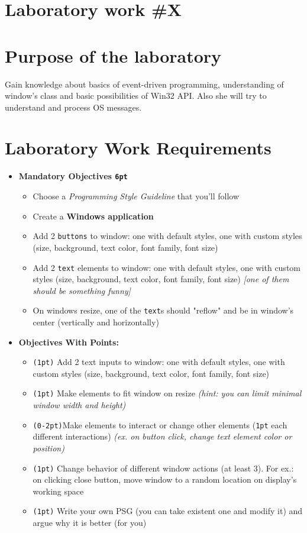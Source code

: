 \section*{Laboratory work \#X}

\section{Purpose of the laboratory}
Gain knowledge about basics of event-driven programming, understanding of window’s class and basic possibilities of Win32 API. Also she will try to understand and process OS messages.
\section{Laboratory Work Requirements}
\begin{itemize}
	\item \textbf{Mandatory Objectives \texttt{6pt}}
	      \begin{itemize}
		      \item Choose a \textit{Programming Style Guideline} that you'll follow
		      \item Create a \textbf{Windows application}
		      \item Add 2 \texttt{buttons} to window: one with default styles, one with custom styles (size, background, text color, font family, font size)
		      \item Add 2 \texttt{text} elements to window: one with default styles, one with custom styles (size, background, text color, font family, font size) \textit{[one of them should be something funny]}
		      \item On windows resize, one of the \texttt{text}s should "reflow" and be in window's center (vertically and horizontally)
	      \end{itemize}
	\item \textbf{Objectives With Points:}
	      \begin{itemize}
		      \item \texttt{(1pt)} Add 2 text inputs to window: one with default styles, one with custom styles (size, background, text color, font family, font size)
		      \item \texttt{(1pt)} Make elements to fit window on resize \textit{(hint: you can limit minimal window width and height)}
		      \item \texttt{(0-2pt)}Make elements to interact or change other elements (\texttt{1pt} each different interactions) \textit{(ex. on button click, change text element color or position)}
		      \item \texttt{(1pt)} Change behavior of different window actions (at least 3). For ex.: on clicking close button, move window to a random location on display's working space
		      \item \texttt{(1pt)} Write your own PSG (you can take existent one and modify it) and argue why it is better (for you)
	      \end{itemize}
\end{itemize}

\clearpage